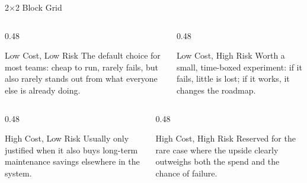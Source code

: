 \documentclass[aspectratio=169]{beamer}
\begin{document}
\begin{frame}{2$\times$2 Block Grid}
  \begin{columns}[T]
    \begin{column}{0.48\textwidth}
      \begin{block}{Low Cost, Low Risk}
        {\small The default choice for most teams: cheap to run,
        rarely fails, but also rarely stands out from what everyone
        else is already doing.}
      \end{block}
    \end{column}
    \begin{column}{0.48\textwidth}
      \begin{block}{Low Cost, High Risk}
        {\small Worth a small, time-boxed experiment: if it fails,
        little is lost; if it works, it changes the roadmap.}
      \end{block}
    \end{column}
  \end{columns}
  \vspace{0.3cm}
  \begin{columns}[T]
    \begin{column}{0.48\textwidth}
      \begin{block}{High Cost, Low Risk}
        {\small Usually only justified when it also buys long-term
        maintenance savings elsewhere in the system.}
      \end{block}
    \end{column}
    \begin{column}{0.48\textwidth}
      \begin{block}{High Cost, High Risk}
        {\small Reserved for the rare case where the upside clearly
        outweighs both the spend and the chance of failure.}
      \end{block}
    \end{column}
  \end{columns}
\end{frame}
\end{document}
